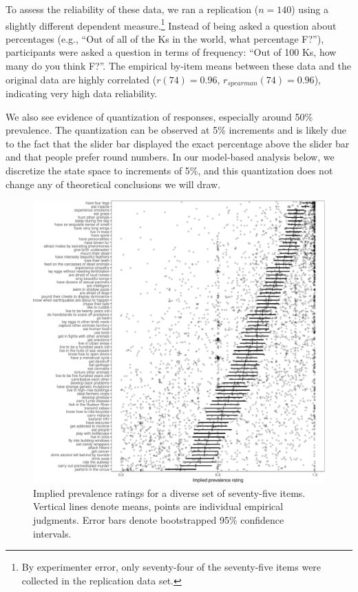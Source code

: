 \documentclass[floatsintext,doc]{apa6}
\let\rmarkdownfootnote\footnote%
\def\footnote{\protect\rmarkdownfootnote}
\begin{document}
To assess the reliability of these data, we ran a replication (\(n=140\)) using a slightly different dependent measure.\footnote{By experimenter error, only seventy-four of the seventy-five items were collected in the replication data set.}
Instead of being asked a question about percentages (e.g., \enquote{Out of all of the Ks in the world, what percentage F?}), participants were asked a question in terms of frequency: \enquote{Out of 100 Ks, how many do you think F?}.
The empirical by-item means between these data and the original data are highly correlated (\(r(74) = 0.96\), \(r_{spearman}(74)= 0.96\)), indicating very high data reliability.

We also see evidence of quantization of responses, especially around 50\% prevalence. The quantization can be observed at 5\% increments and is likely due to the fact that the slider bar displayed the exact percentage above the slider bar and that people prefer round numbers. 
In our model-based analysis below, we discretize the state space to increments of 5\%, and this quantization does not change any of theoretical conclusions we will draw.


\begin{figure}
\centering
\includegraphics{genint_files/figure-latex/genint-empiricalData-1.pdf}
\caption{\label{fig:genint-empiricalData}Implied prevalence ratings for a diverse set of seventy-five items. Vertical lines denote means, points are individual empirical judgments. Error bars denote bootstrapped 95\% confidence intervals.}
\end{figure}
\end{document}
